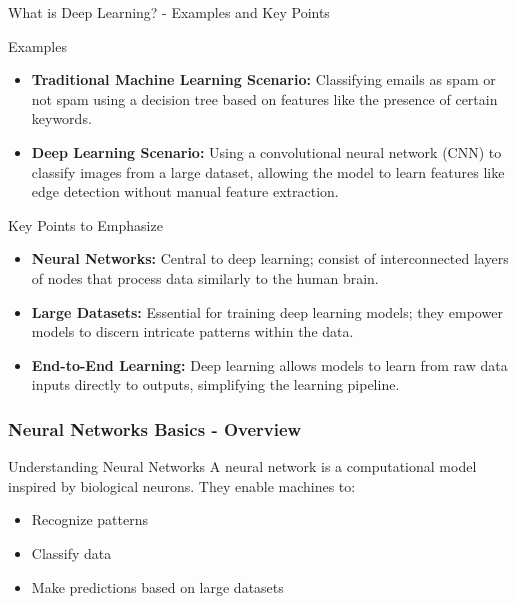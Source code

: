 \documentclass[aspectratio=169]{beamer}
\begin{document}
\begin{frame}[fragile]{What is Deep Learning? - Examples and Key Points}
    \begin{block}{Examples}
        \begin{itemize}
            \item \textbf{Traditional Machine Learning Scenario:} 
            Classifying emails as spam or not spam using a decision tree based on features like the presence of certain keywords.
            
            \item \textbf{Deep Learning Scenario:} 
            Using a convolutional neural network (CNN) to classify images from a large dataset, allowing the model to learn features like edge detection without manual feature extraction.
        \end{itemize}
    \end{block}

    \begin{block}{Key Points to Emphasize}
        \begin{itemize}
            \item \textbf{Neural Networks:} Central to deep learning; consist of interconnected layers of nodes that process data similarly to the human brain.
            \item \textbf{Large Datasets:} Essential for training deep learning models; they empower models to discern intricate patterns within the data.
            \item \textbf{End-to-End Learning:} Deep learning allows models to learn from raw data inputs directly to outputs, simplifying the learning pipeline.
        \end{itemize}
    \end{block}
\end{frame}

\begin{frame}[fragile]
    \frametitle{Neural Networks Basics - Overview}
    \begin{block}{Understanding Neural Networks}
        A neural network is a computational model inspired by biological neurons. They enable machines to:
        \begin{itemize}
            \item Recognize patterns
            \item Classify data
            \item Make predictions based on large datasets
        \end{itemize}
    \end{block}
\end{frame}
\end{document}
